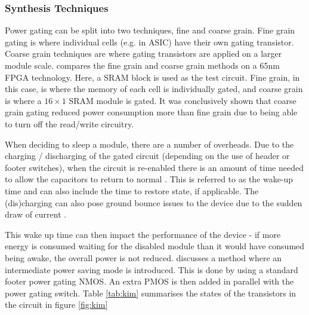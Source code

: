 \subsubsection{Synthesis Techniques}

Power gating can be split into two techniques, fine and coarse grain.
Fine grain gating is where individual cells (e.g. in ASIC) have their own gating transistor. 
Coarse grain techniques are where gating transistors are applied on a larger module scale.
\cite{nair2009comparative} compares the fine grain and coarse grain methods on a 65nm FPGA technology. 
Here, a SRAM block is used as the test circuit. 
Fine grain, in this case, is where the memory of each cell is individually gated, and coarse grain is where a $16 \times 1$ SRAM module is gated. 
It was conclusively shown that coarse grain gating reduced power consumption more than fine grain due to being able to turn off the read/write circuitry. 


When deciding to sleep a module, there are a number of overheads.
Due to the charging / discharging of the gated circuit (depending on the use of header or footer switches), when the circuit is re-enabled there is an amount of time needed to allow the capacitors to return to normal \cite{abdollahi2005effective}.
This is referred to as the wake-up time and can also include the time to restore state, if applicable.
The (dis)charging can also pose ground bounce issues to the device due to the sudden draw of current \cite{kim2003understanding,chang1997analysis}. 

This wake up time can then impact the performance of the device - if more energy is consumed waiting for the disabled module than it would have consumed being awake, the overall power is not reduced.
\cite{kim2004experimental} discusses a method where an intermediate power saving mode is introduced.
This is done by using a standard footer power gating NMOS. 
An extra PMOS is then added in parallel with the power gating switch. 
Table \ref{tab:kim} summarises the states of the transistors in the circuit in figure \ref{fig:kim}

